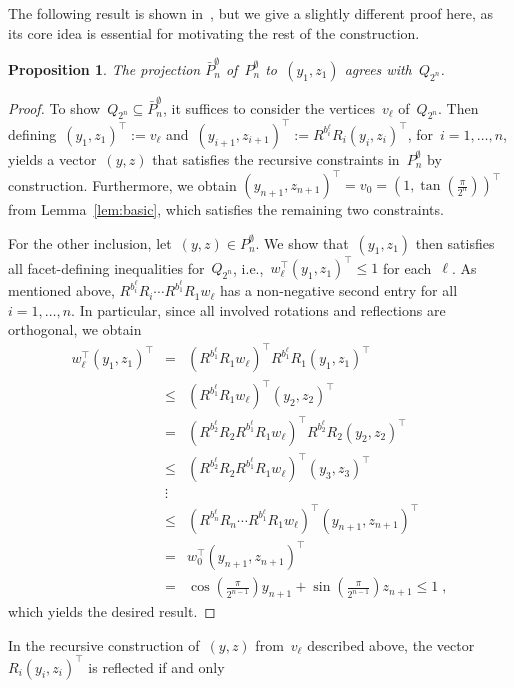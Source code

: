 \documentclass{article}
\newtheorem{proposition}[theorem]{Proposition}
\begin{document}
The following result is shown in~\cite[Prop.~2.1]{BenTal01}, but we
give a slightly different proof here, as its core idea is essential
for motivating the rest of the construction.
\begin{proposition}\label{prop:proj}
  The projection $\bar P^\emptyset_n$ of~$P^\emptyset_n$
  to~$(y_1,z_1)$ agrees with~$Q_{2^n}$.
\end{proposition}
\begin{proof}
  To show~$Q_{2^n}\subseteq \bar P^\emptyset_n$, it suffices to
  consider the vertices~$v_\ell$ of~$Q_{2^n}$. Then
  defining~$(y_1,z_1)^\top:=v_\ell$
  and~$(y_{i+1},z_{i+1})^\top:=R^{b^\ell_i}R_i(y_i,z_i)^\top$,
  for~$i=1,\dots,n$, yields a vector~$(y,z)$ that satisfies the
  recursive constraints in~$P^\emptyset_n$ by
  construction. Furthermore, we obtain
  $(y_{n+1},z_{n+1})^\top=v_0=(1,\tan(\tfrac\pi{2^n}))^\top$ from
  Lemma~\ref{lem:basic}, which satisfies the remaining two
  constraints.

  For the other inclusion, let~$(y,z)\in P^\emptyset_n$. We show
  that~$(y_1,z_1)$ then satisfies all facet-defining inequalities
  for~$Q_{2^n}$, i.e.,~$w_\ell^\top (y_1,z_1)^\top\le 1$ for
  each~$\ell$.  As mentioned above, $R^{b^\ell_i}R_i\cdots
  R^{b^\ell_1}R_1w_\ell$ has a non-negative second entry for
  all~$i=1,\dots,n$. In particular, since all involved rotations and
  reflections are orthogonal, we obtain
  \begin{eqnarray*}
    w_\ell^\top(y_1,z_1)^\top
    & = & (R^{b^\ell_1}R_1w_\ell)^\top R^{b^\ell_1}R_1(y_1,z_1)^\top\\
    & \le & (R^{b^\ell_1}R_1w_\ell)^\top (y_2,z_2)^\top\\
    & = & (R^{b^\ell_2}R_2R^{b^\ell_1}R_1w_\ell)^\top R^{b^\ell_2}R_2(y_2,z_2)^\top\\
    & \le & (R^{b^\ell_2}R_2R^{b^\ell_1}R_1w_\ell)^\top (y_3,z_3)^\top\\
    & \vdots & \\
    & \le & (R^{b^\ell_n}R_n\cdots R^{b^\ell_1}R_1w_\ell)^\top (y_{n+1},z_{n+1})^\top\\
    & = & w_0^\top (y_{n+1},z_{n+1})^\top\\
    & = & \cos(\tfrac\pi{2^{n-1}})y_{n+1}+\sin(\tfrac\pi{2^{n-1}})z_{n+1}\le 1\;,
  \end{eqnarray*}
  which yields the desired result.
\end{proof}
In the recursive construction of~$(y,z)$ from~$v_\ell$ described
above, the vector~$R_i(y_{i},z_{i})^\top$ is reflected if and only
\end{document}
